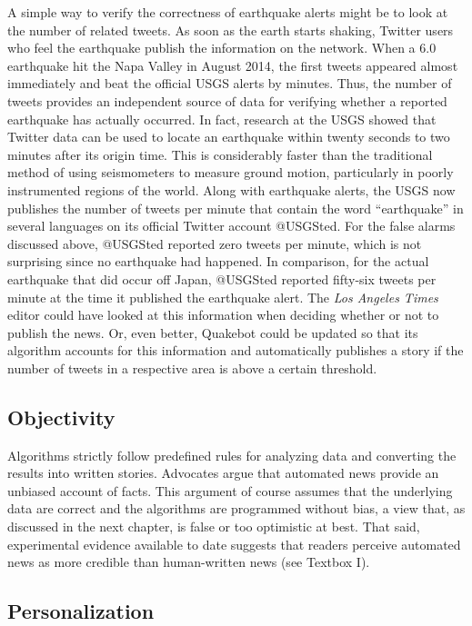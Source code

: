 \documentclass[notoc, symmetric, nobib, nols]{towcenter-guideto-book}
\begin{document}
A simple way to verify the correctness of earthquake alerts might be to look at the number of related tweets. As soon as the earth starts shaking, Twitter users who feel the earthquake publish the information on the network. When a 6.0 earthquake hit the Napa Valley in August 2014, the first tweets appeared almost immediately and beat the official USGS alerts by minutes. Thus, the number of tweets provides an independent source of data for verifying whether a reported earthquake has actually occurred. In fact, research at the USGS showed that Twitter data can be used to locate an earthquake within twenty seconds to two minutes after its origin time. This is considerably faster than the traditional method of using seismometers to measure ground motion, particularly in poorly instrumented regions of the world.\autocite{earle11} Along with earthquake alerts, the USGS now publishes the number of tweets per minute that contain the word ``earthquake'' in several languages on its official Twitter account @USGSted. For the false alarms discussed above, @USGSted reported zero tweets per minute, which is not surprising since no earthquake had happened. In comparison, for the actual earthquake that did occur off Japan, @USGSted reported fifty-six tweets per minute at the time it published the earthquake alert. The \textit{Los Angeles Times} editor could have looked at this information when deciding whether or not to publish the news. Or, even better, Quakebot could be updated so that its algorithm accounts for this information and automatically publishes a story if the number of tweets in a respective area is above a certain threshold.

\subsection{Objectivity}

Algorithms strictly follow predefined rules for analyzing data and converting the results into written stories. Advocates argue that automated news provide an unbiased account of facts. This argument of course assumes that the underlying data are correct and the algorithms are programmed without bias, a view that, as discussed in the next chapter, is false or too optimistic at best.\autocite{lazer14} That said, experimental evidence available to date suggests that readers perceive automated news as more credible than human-written news (see Textbox I).

\subsection{Personalization}
\end{document}
